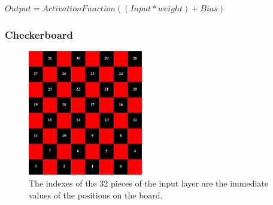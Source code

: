 \documentclass{beamer}
\begin{document}
	\begin{frame}
		$Output = Activation Function ((Input* weight) + Bias)$
	\end{frame}

	\begin{frame}
		\frametitle{Checkerboard}
		\begin{figure}[ht!]
			\centering
			\includegraphics[width=50mm]{checkerboard.png}
			\caption{The indexes of the 32 pieces of the input layer are the immediate values of the positions on the board. \label{overflow}}
		\end{figure}
	\end{frame}
\end{document}
